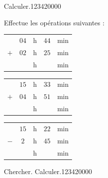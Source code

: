 \begin{pageParcoursd}

 

\begin{ExoCd}{ Calculer.}{1234}{2}{0}{0}{0}{0}
 
 
 
 Effectue  les opérations suivantes :
 
\begin{minipage}{0.30\linewidth}
\begin{tabular}{ccccc} 
& $04$ & h &  $44$ & min \\ 
$+$   & $02$ & h & $25$  & min\\ 
\hline 
   &  & h & & min\\
\end{tabular} 
\end{minipage}
\hfill 
\begin{minipage}{0.30\linewidth}
 \begin{tabular}{ccccc} 
& $15$ & h &  $33$ & min \\ 
$+$   & $04$ & h &  $51$ & min\\ 
\hline 
   &  & h & & min\\
\end{tabular} 
\end{minipage}
\hfill 
\begin{minipage}{0.30\linewidth}
 \begin{tabular}{ccccc} 
& $15$ & h & $22$  & min \\ 
$-$   & $2$ & h & $45$ & min\\ 
\hline 
   &  & h & & min\\
\end{tabular} 
\end{minipage}


\end{ExoCd}

\begin{ExoCd}{ Chercher. Calculer.}{1234}{2}{0}{0}{0}{0}
 



\end{ExoCd}
\end{pageParcoursd}
